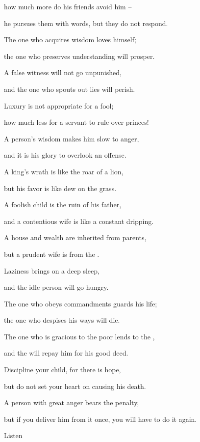 {\par }{\Q how much
more do his friends
avoid him –
\par }{\Q he pursues them with words, but they do not respond.
\par }{\Q {}The one who acquires
wisdom
loves
himself;
\par }{\Q the one who preserves
understanding
will prosper.
\par }{\Q {}A false
witness
will not
go unpunished,
\par }{\Q and the one who spouts out
lies
will perish.
\par }{\Q {}Luxury
is not
appropriate
for a fool;
\par }{\Q how much
less for
a servant
to rule
over princes!
\par }{\Q {}A person’s
wisdom
makes him slow
to anger,
\par }{\Q and it is his glory
to overlook
an offense.
\par }{\Q {}A king’s
wrath
is like the roar
of a lion,
\par }{\Q but
his favor
is like dew
on
the grass.
\par }{\Q {}A foolish
child
is the ruin of his father,
\par }{\Q and a contentious
wife
is like a constant
dripping.
\par }{\Q {}A house
and wealth
are inherited
from parents,
\par }{\Q but a prudent
wife
is from the
{}.
\par }{\Q {}Laziness
brings on
a deep sleep,
\par }{\Q and the idle
person
will go hungry.
\par }{\Q {}The one who obeys
commandments
guards
his life;
\par }{\Q the one who despises
his ways
will die.
\par }{\Q {}The one who is gracious
to the poor
lends
to the
{},
\par }{\Q and the
{} will repay
him for his good deed.
\par }{\Q {}Discipline
your child,
for
there is
hope,
\par }{\Q but do not
set
your heart
on
causing his death.
\par }{\Q {}A person with great
anger bears
the penalty,
\par }{\Q but if
you deliver
him from it once, you will
have to do it again.
\par }{\Q {}Listen
}
